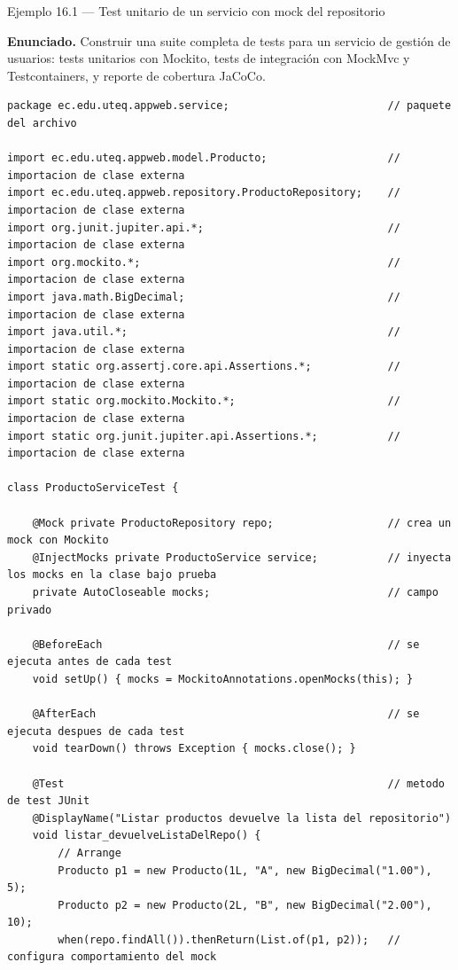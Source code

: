 \documentclass[11pt,a4paper,openany]{book}
\begin{document}
\begin{cajaejemplo}{Ejemplo 16.1 --- Test unitario de un servicio con mock del repositorio}

\textbf{Enunciado.} Construir una suite completa de tests para un servicio de gestión de usuarios: tests unitarios con Mockito, tests de integración con MockMvc y Testcontainers, y reporte de cobertura JaCoCo.

\begin{lstlisting}[style=java,caption={ProductoServiceTest.java},label=lst:16.1]
package ec.edu.uteq.appweb.service;                         // paquete del archivo

import ec.edu.uteq.appweb.model.Producto;                   // importacion de clase externa
import ec.edu.uteq.appweb.repository.ProductoRepository;    // importacion de clase externa
import org.junit.jupiter.api.*;                             // importacion de clase externa
import org.mockito.*;                                       // importacion de clase externa
import java.math.BigDecimal;                                // importacion de clase externa
import java.util.*;                                         // importacion de clase externa
import static org.assertj.core.api.Assertions.*;            // importacion de clase externa
import static org.mockito.Mockito.*;                        // importacion de clase externa
import static org.junit.jupiter.api.Assertions.*;           // importacion de clase externa

class ProductoServiceTest {

    @Mock private ProductoRepository repo;                  // crea un mock con Mockito
    @InjectMocks private ProductoService service;           // inyecta los mocks en la clase bajo prueba
    private AutoCloseable mocks;                            // campo privado

    @BeforeEach                                             // se ejecuta antes de cada test
    void setUp() { mocks = MockitoAnnotations.openMocks(this); }

    @AfterEach                                              // se ejecuta despues de cada test
    void tearDown() throws Exception { mocks.close(); }

    @Test                                                   // metodo de test JUnit
    @DisplayName("Listar productos devuelve la lista del repositorio")
    void listar_devuelveListaDelRepo() {
        // Arrange
        Producto p1 = new Producto(1L, "A", new BigDecimal("1.00"), 5);
        Producto p2 = new Producto(2L, "B", new BigDecimal("2.00"), 10);
        when(repo.findAll()).thenReturn(List.of(p1, p2));   // configura comportamiento del mock


\end{lstlisting}
\end{cajaejemplo}
\end{document}
